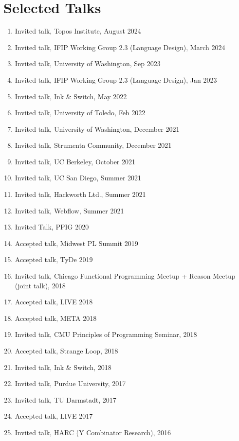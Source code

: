 \documentclass[10pt,letterpaper]{article}
\begin{document}
\section*{Selected Talks}
\begin{enumerate}
  \item Invited talk, Topos Institute, August 2024
  \item Invited talk, IFIP Working Group 2.3 (Language Design), March 2024
  \item Invited talk, University of Washington, Sep 2023
  \item Invited talk, IFIP Working Group 2.3 (Language Design), Jan 2023
  \item Invited talk, Ink \& Switch, May 2022
  \item Invited talk, University of Toledo, Feb 2022
  \item Invited talk, University of Washington, December 2021
  \item Invited talk, Strumenta Community, December 2021
  \item Invited talk, UC Berkeley, October 2021
  \item Invited talk, UC San Diego, Summer 2021
  \item Invited talk, Hackworth Ltd., Summer 2021
  \item Invited talk, Webflow, Summer 2021
  \item Invited Talk, PPIG 2020
  \item Accepted talk, Midwest PL Summit 2019
  \item Accepted talk, TyDe 2019
  \item Invited talk, Chicago Functional Programming Meetup + Reason Meetup (joint talk), 2018
  \item Accepted talk, LIVE 2018
  \item Accepted talk, META 2018
  \item Invited talk, CMU Principles of Programming Seminar, 2018
  \item Accepted talk, Strange Loop, 2018
  \item Invited talk, Ink \& Switch, 2018
  \item Invited talk, Purdue University, 2017
  \item Invited talk, TU Darmstadt, 2017
  \item Accepted talk, LIVE 2017
  \item Invited talk, HARC (Y Combinator Research), 2016

\end{enumerate}
\end{document}
